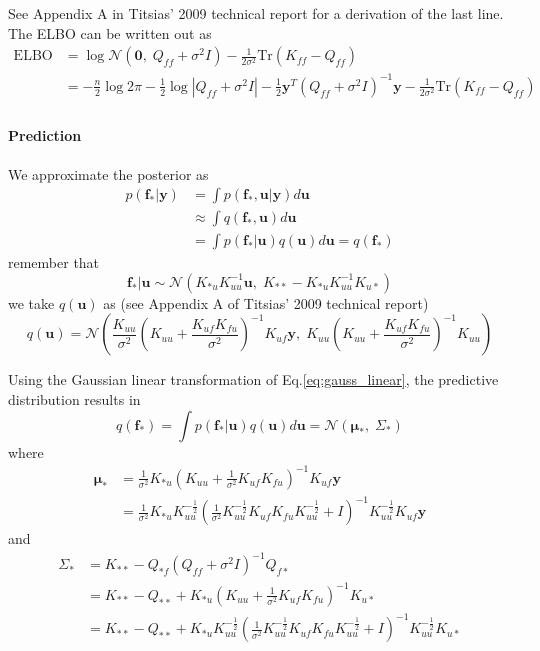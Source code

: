 \documentclass[5p,11pt]{article}
\begin{document}
See Appendix A in Titsias' 2009 technical report for a derivation of the last line. The ELBO can be written out as
\begin{equation}
    \begin{aligned}
    \mathrm{ELBO} &= \log \mathcal{N}(\bm{0},\;Q_{ff}+\sigma^2I) - \frac{1}{2\sigma^2}\mathrm{Tr}(K_{ff} - Q_{ff})\\
    &= -\frac{n}{2} \log 2\pi - \frac{1}{2}\log\left|Q_{ff}+\sigma^2I\right| - \frac{1}{2}\bm{y}^T(Q_{ff}+\sigma^2I)^{-1}\bm{y} - \frac{1}{2\sigma^2}\mathrm{Tr}(K_{ff} - Q_{ff})\\
    \end{aligned}
\end{equation}

\paragraph{Prediction} We approximate the posterior as
\begin{equation}
    \begin{aligned}
p(\bm{f}_*|\bm{y}) &= \int p(\bm{f}_*,\bm{u}|\bm{y}) d\bm{u}\\
&\approx \int q(\bm{f}_*,\bm{u}) d\bm{u}\\
&= \int p(\bm{f}_*|\bm{u})q(\bm{u}) d\bm{u} = q(\bm{f}_*)
    \end{aligned}
\end{equation}
remember that
$$ \bm{f}_*|\bm{u} \sim \mathcal{N}(K_{*u}K_{uu}^{-1}\bm{u},\; K_{**}-K_{*u}K_{uu}^{-1}K_{u*}) $$
we take $q(\bm{u})$ as (see Appendix A of Titsias' 2009 technical report)
$$ q(\bm{u}) = \mathcal{N}\left(\frac{K_{uu}}{\sigma^2}\left(K_{uu} + \frac{K_{uf}K_{fu}}{\sigma^2}\right)^{-1}K_{uf}\bm{y},\; K_{uu}\left(K_{uu} + \frac{K_{uf}K_{fu}}{\sigma^2}\right)^{-1}K_{uu}\right) $$

Using the Gaussian linear transformation of Eq.\ref{eq:gauss_linear}, the predictive distribution results in
$$ q(\bm{f}_*) = \int p(\bm{f}_*|\bm{u})q(\bm{u}) d\bm{u} = \mathcal{N}(\bm{\mu}_*,\; \Sigma_*) $$
where
\begin{equation}
    \begin{aligned}
        \bm{\mu}_* &= \frac{1}{\sigma^2}K_{*u}(K_{uu}+\frac{1}{\sigma^2}K_{uf}K_{fu})^{-1}K_{uf}\bm{y}\\
        &= \frac{1}{\sigma^2}K_{*u}K_{uu}^{-\frac{1}{2}}(\frac{1}{\sigma^2}K_{uu}^{-\frac{1}{2}}K_{uf}K_{fu}K_{uu}^{-\frac{1}{2}} + I)^{-1}K_{uu}^{-\frac{1}{2}}K_{uf}\bm{y}
    \end{aligned}
\end{equation}
and
\begin{equation}
    \begin{aligned}
        \Sigma_* &= K_{**}-Q_{*f}(Q_{ff}+\sigma^2I)^{-1}Q_{f*}\\
        &= K_{**}-Q_{**}+K_{*u}(K_{uu}+\frac{1}{\sigma^2}K_{uf}K_{fu})^{-1}K_{u*}\\
        &= K_{**}-Q_{**}+K_{*u}K_{uu}^{-\frac{1}{2}}(\frac{1}{\sigma^2}K_{uu}^{-\frac{1}{2}}K_{uf}K_{fu}K_{uu}^{-\frac{1}{2}} + I)^{-1}K_{uu}^{-\frac{1}{2}}K_{u*}
    \end{aligned}
\end{equation}
\end{document}
